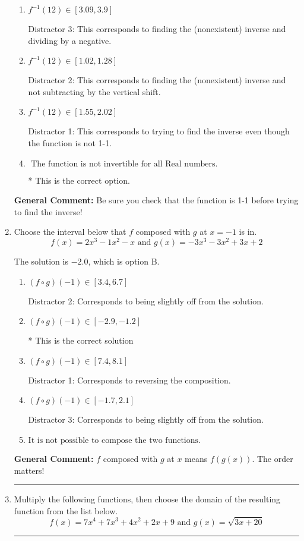 \documentclass{extbook}[14pt]
\newcommand{\litem}[1]{\item #1

\rule{\textwidth}{0.4pt}}
\begin{document}
\begin{enumerate}
{\begin{enumerate}[label=\Alph*.]
 Distractor 4: This corresponds to both distractors 2 and 3.
\item \( f^{-1}(12) \in [3.09, 3.9] \)

 Distractor 3: This corresponds to finding the (nonexistent) inverse and dividing by a negative.
\item \( f^{-1}(12) \in [1.02, 1.28] \)

 Distractor 2: This corresponds to finding the (nonexistent) inverse and not subtracting by the vertical shift.
\item \( f^{-1}(12) \in [1.55, 2.02] \)

 Distractor 1: This corresponds to trying to find the inverse even though the function is not 1-1. 
\item \( \text{ The function is not invertible for all Real numbers. } \)

* This is the correct option.
\end{enumerate}

\textbf{General Comment:} Be sure you check that the function is 1-1 before trying to find the inverse!
}
\litem{
Choose the interval below that $f$ composed with $g$ at $x=-1$ is in.
\[ f(x) = 2x^{3} -1 x^{2} -x \text{ and } g(x) = -3x^{3} -3 x^{2} +3 x + 2 \]

The solution is \( -2.0 \), which is option B.\begin{enumerate}[label=\Alph*.]
\item \( (f \circ g)(-1) \in [3.4, 6.7] \)

 Distractor 2: Corresponds to being slightly off from the solution.
\item \( (f \circ g)(-1) \in [-2.9, -1.2] \)

* This is the correct solution
\item \( (f \circ g)(-1) \in [7.4, 8.1] \)

 Distractor 1: Corresponds to reversing the composition.
\item \( (f \circ g)(-1) \in [-1.7, 2.1] \)

 Distractor 3: Corresponds to being slightly off from the solution.
\item \( \text{It is not possible to compose the two functions.} \)


\end{enumerate}

\textbf{General Comment:} $f$ composed with $g$ at $x$ means $f(g(x))$. The order matters!
}
\litem{
Multiply the following functions, then choose the domain of the resulting function from the list below.
\[ f(x) = 7x^{4} +7 x^{3} +4 x^{2} +2 x + 9 \text{ and } g(x) = \sqrt{3x+20}  \]

}
\end{enumerate}
\end{document}

